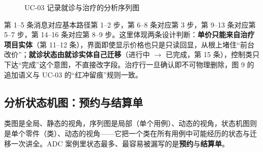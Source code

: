 \documentclass[11pt,a4paper]{ctexart}
\newcommand{\figtag}[1]{%
  \tikz[baseline=-0.35ex]{\node[fill=adcblue!90,text=white,rounded corners=1.5pt,
    inner xsep=5pt,inner ysep=1.2pt,font=\scriptsize\bfseries]{#1};}\hspace{2pt}}
\begin{document}
\begin{figure}[H]
\caption{UC-03 记录就诊与治疗的分析序列图}
\end{figure}

\figtag{图 9 说明} 第 1--5 条消息对应基本路径第 1--2 步，第 6--8 条对应第 3 步，第 9--13 条对应第 5--7 步，第 14--16 条对应第 8--9 步。这里体现两条设计判断：\textbf{单价只能来自治疗项目实体}（第 11--12 条），界面即使显示价格也只是只读回显，从根上堵住“前台改价”；\textbf{就诊状态由就诊实体自己迁移}（进行中 $\rightarrow$ 已完成，第 15 条），控制类只下达“完成”这个意图，不直接改字段。治疗行一旦确认即不可物理删除，图 9 的追加语义与 UC-03 的“红冲留痕”规则一致。

\subsection{分析状态机图：预约与结算单}

类图是全局、静态的视角，序列图是局部（单个用例）、动态的视角，状态机图则是单个零件（类）、动态的视角——它把一个类在所有用例中可能经历的状态与迁移一次讲全。ADC 案例里状态最多、最容易被漏写的是\textbf{预约}与\textbf{结算单}。
\end{document}
